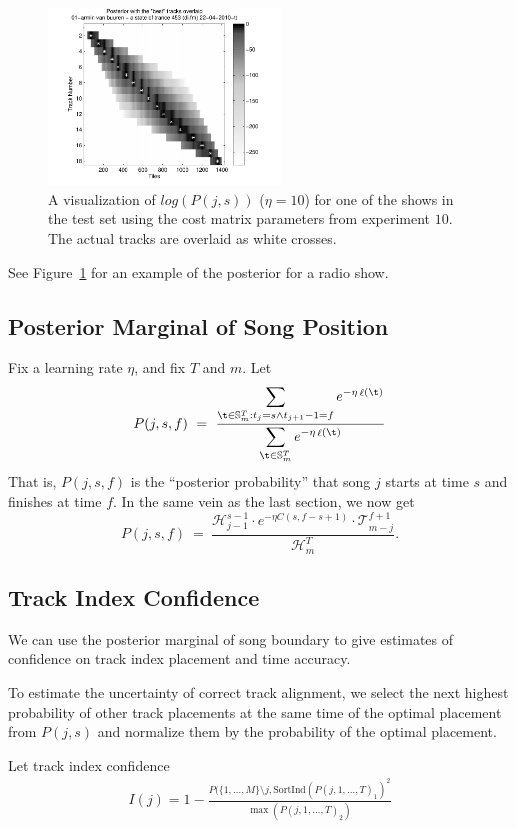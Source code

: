 \documentclass[twocolumn]{article}
\DeclareMathOperator{\loss}{\ell}
\newcommand{\segs}{\mathbb S}
\newcommand{\head}{\mathcal H}
\newcommand{\tail}{\mathcal T}
\begin{document}
\begin{figure}
	\centering
	\includegraphics[width=0.55\textwidth]{images/posterior}
	\caption{A visualization of $log(P(j,s))$ ($\eta=10$) for one of the shows in the test set using the cost matrix parameters from experiment $10$. The actual tracks are overlaid as white crosses.}
	\label{fig:posterior}
\end{figure} 

See Figure~\ref{fig:posterior} for an example of the posterior for a radio show. 

\subsection{Posterior Marginal of Song Position}
Fix a learning rate $\eta$, and fix $T$ and $m$. Let
\[
P(j,s,f) ~=~ 
\frac{\displaystyle
	\sum_{\t \in \segs^T_m : t_j = s \land t_{j+1}-1 = f} e^{- \eta \loss(\t)}
}{\displaystyle
\sum_{\t \in \segs^T_m} e^{- \eta \loss(\t)}
}
\]
That is, $P(j,s,f)$ is the ``posterior probability'' that song $j$ starts at time $s$ and finishes at time $f$.
%
In the same vein as the last section, we now get
\[
P(j,s,f) ~=~ \frac{\head^{s-1}_{j-1} \cdot e^{-\eta C(s, f-s+1)} \cdot \tail^{f+1}_{m-j}}{\head^T_m}.
\]


\subsection{Track Index Confidence}

We can use the posterior marginal of song boundary to give estimates of confidence on track index placement and time accuracy.

To estimate the uncertainty of correct track alignment, we select the next highest probability of other track placements at the same time of the optimal placement from $P(j,s)$ and normalize them by the probability of the optimal placement.

Let track index confidence
\begin{align*}
I( j ) = 1-\frac{ P( \{1,\ldots,M\} \setminus j, \mathrm{SortInd}( P(j, 1,\ldots,T)_1)^2 }{ \max( P(j, 1,\ldots,T)_2) }
\end{align*}
\end{document}
